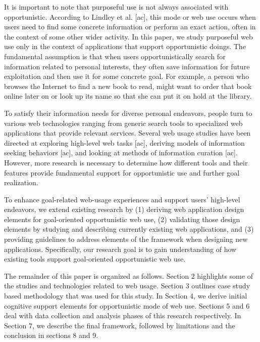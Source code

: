 \documentclass{casconpaper}
\begin{document}
{It is important to note that purposeful use is not always associated with opportunistic. According to Lindley et al. [ac], this mode or web use occurs when users need to find some concrete information or perform an exact action, often in the context of some other wider activity. In this paper, we study purposeful web use only in the context of applications that support opportunistic doings. The fundamental assumption is that when users opportunistically search for information related to personal interests, they often save information for future exploitation and then use it for some concrete goal. For example, a person who browses the Internet to find a new book to read, might want to order that book online later on or look up its name so that she can put it on hold at the library. 

To satisfy their information needs for diverse personal endeavors, people turn to various web technologies ranging from generic search tools to specialized web applications that provide relevant services. Several web usage studies have been directed at exploring high-level web tasks [ac], deriving models of information seeking behaviors [ac], and looking at methods of information curation [ac]. However, more research is necessary to determine how different tools and their features provide fundamental support for opportunistic use and further goal realization.

To enhance goal-related web-usage experiences and support users’ high-level endeavors, we extend existing research by (1) deriving web application design elements for goal-oriented opportunistic web use, (2) validating those design elements by studying and describing currently existing web applications, and (3) providing guidelines to address elements of the framework when designing new applications. Specifically, our research goal is to gain understanding of how existing tools support goal-oriented opportunistic web use. 

The remainder of this paper is organized as follows. Section 2 highlights some of the studies and technologies related to web usage. Section 3 outlines case study based methodology that was used for this study. In Section 4, we derive initial cognitive support elements for opportunistic mode of web use.  Sections 5 and 6 deal with data collection and analysis phases of this research respectively. In Section 7, we describe the final framework, followed by limitations and the conclusion in sections 8 and 9.

} %
\end{document}
